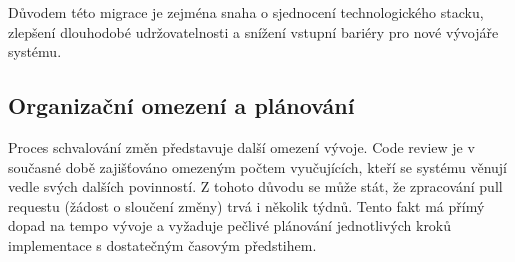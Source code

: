 Důvodem této migrace je zejména snaha o sjednocení technologického stacku, zlepšení dlouhodobé udržovatelnosti a snížení vstupní bariéry pro nové vývojáře systému.

\subsection*{Organizační omezení a plánování}

Proces schvalování změn představuje další omezení vývoje.
Code review je v současné době zajišťováno omezeným počtem vyučujících, kteří se systému věnují vedle svých dalších povinností.
Z tohoto důvodu se může stát, že zpracování pull requestu (žádost o sloučení změny) trvá i několik týdnů.
Tento fakt má přímý dopad na tempo vývoje a vyžaduje pečlivé plánování jednotlivých kroků implementace s dostatečným časovým předstihem.

\endinput
